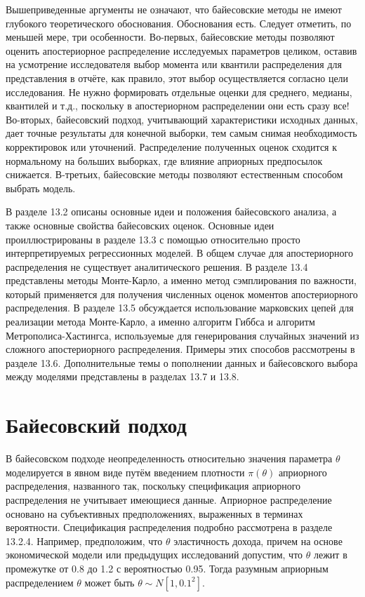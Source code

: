 Вышеприведенные аргументы не означают, что байесовские методы не имеют глубокого теоретического обоснования. Обоснования есть. Следует отметить, по меньшей мере, три особенности. Во-первых, байесовские методы позволяют оценить апостериорное распределение исследуемых параметров целиком, оставив на усмотрение исследователя выбор момента или квантили распределения для представления в отчёте, как правило, этот выбор осуществляется согласно цели исследования. Не нужно формировать отдельные оценки для среднего, медианы, квантилей и т.д., поскольку в апостериорном распределении они есть сразу все! Во-вторых, байесовский подход, учитывающий характеристики исходных данных, дает точные результаты для конечной выборки, тем самым снимая  необходимость корректировок или уточнений. Распределение полученных оценок сходится к нормальному на больших выборках, где влияние априорных предпосылок снижается. В-третьих, байесовские методы позволяют естественным способом выбрать модель.

В разделе 13.2 описаны  основные идеи и положения байесовского анализа, а также основные свойства байесовских оценок. Основные идеи проиллюстрированы в разделе 13.3 с помощью относительно просто интерпретируемых регрессионных моделей. В общем случае для апостериорного распределения не существует аналитического решения. В разделе 13.4 представлены методы Монте-Карло, а именно метод сэмплирования по важности, который применяется для получения численных оценок моментов апостериорного распределения. В разделе 13.5 обсуждается использование марковских цепей для реализации метода Монте-Карло, а именно алгоритм Гиббса и алгоритм Метрополиса-Хастингса, используемые для генерирования случайных значений из сложного апостериорного распределения. Примеры этих способов рассмотрены в разделе 13.6. Дополнительные темы о пополнении данных и байесовского выбора между моделями представлены в разделах 13.7 и 13.8.

\section{Байесовский подход}

В байесовском подходе неопределенность относительно значения параметра $\theta$ моделируется в явном виде путём введением плотности $\pi(\theta)$ априорного распределения, названного так, поскольку спецификация априорного распределения не учитывает имеющиеся данные. Априорное распределение основано на субъективных предположениях, выраженных в терминах вероятности. Спецификация распределения подробно рассмотрена в разделе 13.2.4. Например, предположим, что $\theta$ эластичность дохода, причем на основе экономической модели или  предыдущих исследований допустим, что $\theta$ лежит в промежутке от 0.8 до 1.2 с вероятностью 0.95. Тогда разумным априорным распределением $\theta$ может быть $\theta{\sim}N[1,0.1^{2}]$.

